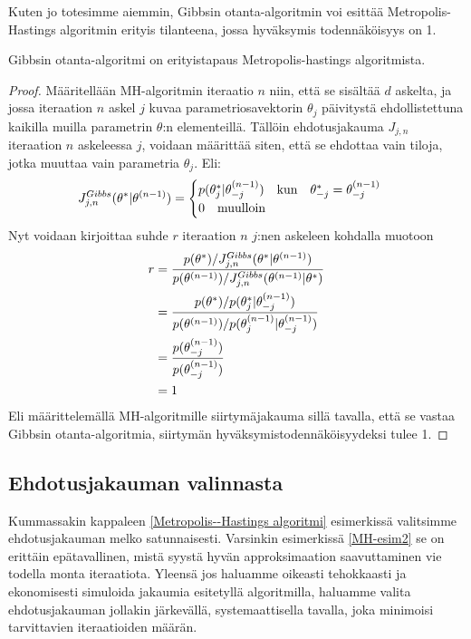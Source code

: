 Kuten jo totesimme aiemmin, Gibbsin otanta-algoritmin voi esittää Metropolis-Hastings algoritmin erityis tilanteena, jossa hyväksymis todennäköisyys on 1.

\begin{lause}
	Gibbsin otanta-algoritmi on erityistapaus Metropolis-hastings algoritmista.
\end{lause}

\begin{proof}
	Määritellään MH-algoritmin iteraatio $n$ niin, että  se sisältää $d$ askelta, ja jossa iteraation $n$ askel $j$ kuvaa parametriosavektorin $\theta_j$ päivitystä ehdollistettuna kaikilla muilla parametrin $\theta$:n elementeillä. Tällöin ehdotusjakauma $J_{j,n}$ iteraation $n$ askeleessa $j$, voidaan määrittää siten, että se ehdottaa vain tiloja, jotka muuttaa vain parametria $\theta_j$. Eli:
	\begin{equation}
		J_{j,n}^{Gibbs}(\theta^*|\tnm)=\begin{cases}
			p(\theta^*_j|\tnm_{-j}) \qq{kun} \theta^*_{-j}=\tnm_{-j} \\
			0 \qq{muulloin}
		\end{cases}
	\end{equation}
	Nyt voidaan kirjoittaa suhde $r$ iteraation $n$ $j$:nen askeleen kohdalla muotoon
	\begin{equation}
		\begin{split}
			r &= \frac{p(\theta^*)/J_{j,n}^{Gibbs}(\theta^*|\theta^{(n-1)})}
			{p(\theta^{(n-1)})/J_{j,n}^{Gibbs}(\theta^{(n-1)}|\theta^*)} \\
			&= \frac{p(\theta^*)/p(\theta^*_j|\theta^{(n-1)}_{-j})}
			{p(\theta^{(n-1)})/p(\theta^{(n-1)}_{j}|\theta^{(n-1)}_{-j})} \\
			&= \frac{p(\theta^{(n-1)}_{-j})}{p(\theta^{(n-1)}_{-j})} \\
			&= 1
		\end{split}
	\end{equation}
	Eli määrittelemällä MH-algoritmille siirtymäjakauma sillä tavalla, että se vastaa Gibbsin otanta-algoritmia, siirtymän hyväksymistodennäköisyydeksi tulee 1.
\end{proof}

\subsection{Ehdotusjakauman valinnasta}

Kummassakin kappaleen \ref{Metropolis--Hastings algoritmi} esimerkissä valitsimme ehdotusjakauman melko satunnaisesti. Varsinkin esimerkissä \ref{MH-esim2} se on erittäin epätavallinen, mistä syystä hyvän approksimaation saavuttaminen vie todella monta iteraatiota. Yleensä jos haluamme oikeasti tehokkaasti ja ekonomisesti simuloida jakaumia esitetyllä algoritmilla, haluamme valita ehdotusjakauman jollakin järkevällä, systemaattisella tavalla, joka minimoisi tarvittavien iteraatioiden määrän.

